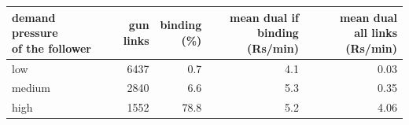 \begin{tabular}{lrrrr}\toprule
\shortstack{demand pressure\\of the follower} & gun links & \shortstack{binding\\(\%)} & \shortstack{mean dual if\\binding (Rs/min)} & \shortstack{mean dual\\all links (Rs/min)} \\ \midrule
low & 6437 & 0.7 & 4.1 & 0.03 \\
medium & 2840 & 6.6 & 5.3 & 0.35 \\
high & 1552 & 78.8 & 5.2 & 4.06 \\
\bottomrule\end{tabular}
